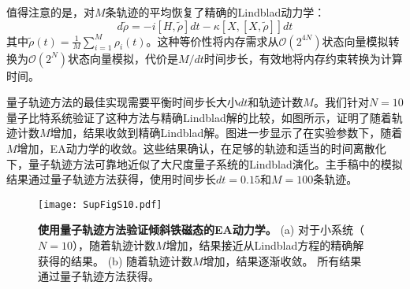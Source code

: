 \documentclass[11pt,a4paper]{article}
\begin{document}
值得注意的是，对$M$条轨迹的平均恢复了精确的Lindblad动力学：
\[
d\tilde{\rho} = -i[H,\tilde{\rho}]dt - \kappa[X,[X,\tilde{\rho}]]dt
\]
其中$\tilde{\rho}(t) = \frac{1}{M}\sum_{i=1}^{M}\rho_i(t)$。这种等价性将内存需求从$\mathcal{O}(2^{4N})$状态向量模拟转换为$\mathcal{O}(2^{N})$状态向量模拟，代价是$M/dt$时间步长，有效地将内存约束转换为计算时间。

量子轨迹方法的最佳实现需要平衡时间步长大小$dt$和轨迹计数$M$。我们针对$N=10$量子比特系统验证了这种方法与精确Lindblad解的比较，如图所示，证明了随着轨迹计数$M$增加，结果收敛到精确Lindblad解。图进一步显示了在实验参数下，随着$M$增加，EA动力学的收敛。这些结果确认，在足够的轨迹和适当的时间离散化下，量子轨迹方法可靠地近似了大尺度量子系统的Lindblad演化。主手稿中的模拟结果通过量子轨迹方法获得，使用时间步长$dt=0.15$和$M=100$条轨迹。

\begin{figure}[H]
    \centering
    \texttt{[image: SupFigS10.pdf]}
    \caption{
        \textbf{使用量子轨迹方法验证倾斜铁磁态的EA动力学。}
        (a) 对于小系统（$N=10$），随着轨迹计数$M$增加，结果接近从Lindblad方程的精确解获得的结果。
        (b) 随着轨迹计数$M$增加，结果逐渐收敛。
        所有结果通过量子轨迹方法获得。
    }
    \label{fig:quantum_trajectory_verification}
\end{figure}
\end{document}
